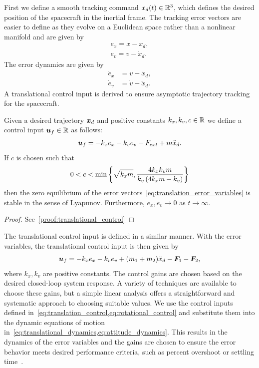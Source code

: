 First we define a smooth tracking command \( x_d(t) \in \mathbb{R}^3 \), which defines the desired position of the spacecraft in the inertial frame.
The tracking error vectors are easier to define as they evolve on a Euclidean space rather than a nonlinear manifold and are given by
\begin{align}\label{eq:translation_error_variables}
    e_x = x - x_d ,\\
    e_v = v - \dot{x}_d.
\end{align}
The error dynamics are given by
\begin{align}\label{eq:translation_error_dynamics}
    \dot{e}_x &= v - \dot{x}_d, \\
    \dot{e}_v &= \dot{v} - \ddot{x}_d .
\end{align}
A translational control input is derived to ensure asymptotic trajectory tracking for the spacecraft.
\begin{prop}\label{prop:translational_control}
    Given a desired trajectory \( \bm{x}_d \) and positive constants \( k_x, k_v, c \in \mathbb{R} \) we define a control input \( \bm{u}_f \in \mathbb{R} \) as follows:
    \begin{align}\label{eq:translational_control}
        \bm{u}_f = -k_x e_x - k_v e_v - F_{ext} + m \ddot{x}_d .
    \end{align}
    If \( c \) is chosen such that
    \begin{align}\label{eq:translational_control_gain_bound}
        0 < c < \min \left\{ \sqrt{k_x m}, \frac{4 k_x k_v m}{ k_v \left( 4 k_x m - k_v \right) }    \right\}
    \end{align}
    then the zero equilibrium of the error vectors~\cref{eq:translation_error_variables} is stable in the sense of Lyapunov.
    Furthermore, \( e_x, e_v \to 0 \) as \( t \to \infty\).
\end{prop}
\begin{proof}
    See~\cref{proof:translational_control}
\end{proof}

The translational control input is defined in a similar manner. 
With the error variables, the translational control input is then given by
\begin{align}\label{eq:translation_control}
    \bm{u}_f = - k_x e_x  - k_v e_v + ( m_1  + m_2 ) \ddot{x}_d - \bm{F}_1 - \bm{F}_2 ,
\end{align}
where \( k_x, k_v \) are positive constants. 
The control gains are chosen based on the desired closed-loop system response. 
A variety of techniques are available to choose these gains, but a simple linear analysis offers a straightforward and systematic approach to choosing suitable values. 
We use the control inputs defined in~\cref{eq:translation_control,eq:rotational_control} and substitute them into the dynamic equations of motion in~\cref{eq:translational_dynamics,eq:attitude_dynamics}.
This results in the dynamics of the error variables and the gains are chosen to ensure the error behavior meets desired performance criteria, such as percent overshoot or settling time~\cite{nise2004}.


